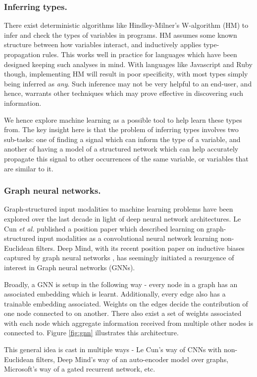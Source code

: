 \subsubsection{Inferring types.}
There exist deterministic algorithms like Hindley-Milner's W-algorithm (HM) to infer and check the types of variables in programs. HM assumes some known structure between how variables interact, and inductively applies type-propagation rules. This works well in practice for languages which have been designed keeping such analyses in mind. With languages like Javascript and Ruby though, implementing HM will result in poor specificity, with most types simply being inferred as \textit{any}. Such inference may not be very helpful to an end-user, and hence, warrants other techniques which may prove effective in discovering such information.

We hence explore machine learning as a possible tool to help learn these types from. The key insight here is that the problem of inferring types involves two sub-tasks: one of finding a signal which can inform the type of a variable, and another of having a model of a structured network which can help accurately propagate this signal to other occurrences of the same variable, or variables that are similar to it.

\subsubsection{Graph neural networks.}
Graph-structured input modalities to machine learning problems have been explored over the last decade in light of deep neural network architectures. Le Cun \textit{et al.} published a position paper \cite{} which described learning on graph-structured input modalities as a convolutional neural network learning non-Euclidean filters. Deep Mind, with its recent position paper on inductive biases captured by graph neural networks \cite{}, has seemingly initiated a resurgence of interest in Graph neural networks (GNNs).

Broadly, a GNN is setup in the following way - every node in a graph has an associated embedding which is learnt. Additionally, every edge also has a trainable embedding associated. Weights on the edges decide the contribution of one node connected to on another. There also exist a set of weights associated with each node which aggregate information received from multiple other nodes is connected to. Figure \ref{fig:gnn} illustrates this architecture.

This general idea is cast in multiple ways - Le Cun's way of CNNs with non-Euclidean filters, Deep Mind's way of an auto-encoder model over graphs, Microsoft's way of a gated recurrent network, etc.

